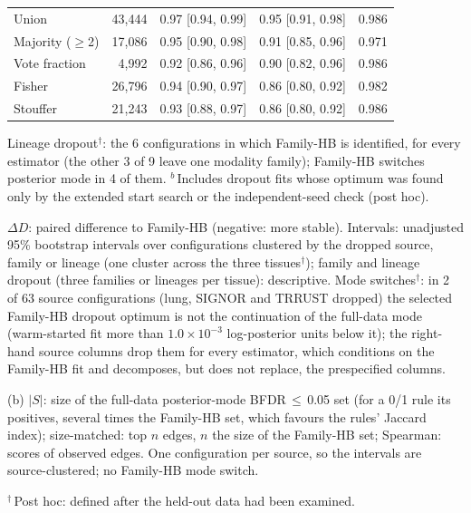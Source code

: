 \documentclass[11pt,a4paper]{article}
\begin{document}
\begin{table}[tbp]
{\begin{tabular}{@{}lrccc@{}}
Union & 43{,}444 & 0.97 [0.94, 0.99] & 0.95 [0.91, 0.98] & 0.986 \\
Majority ($\geq$2) & 17{,}086 & 0.95 [0.90, 0.98] & 0.91 [0.85, 0.96] & 0.971 \\
Vote fraction & 4{,}992 & 0.92 [0.86, 0.96] & 0.90 [0.82, 0.96] & 0.986 \\
Fisher & 26{,}796 & 0.94 [0.90, 0.97] & 0.86 [0.80, 0.92] & 0.982 \\
Stouffer & 21{,}243 & 0.93 [0.88, 0.97] & 0.86 [0.80, 0.92] & 0.986 \\
\bottomrule
\end{tabular}
}
\par\smallskip
\begin{minipage}{\linewidth}\footnotesize
Lineage dropout$^{\dagger}$: the 6 configurations in which Family-HB is identified, for every estimator (the other 3 of 9 leave one modality family); Family-HB switches posterior mode in 4 of them. $^{b}$\,Includes dropout fits whose optimum was found only by the extended start search or the independent-seed check (post hoc).

$\Delta D$: paired difference to Family-HB (negative: more stable). Intervals: unadjusted 95\% bootstrap intervals over configurations clustered by the dropped source, family or lineage (one cluster across the three tissues$^{\dagger}$); family and lineage dropout (three families or lineages per tissue): descriptive. Mode switches$^{\dagger}$: in 2 of 63 source configurations (lung, SIGNOR and TRRUST dropped) the selected Family-HB dropout optimum is not the continuation of the full-data mode (warm-started fit more than $1.0\times 10^{-3}$ log-posterior units below it); the right-hand source columns drop them for every estimator, which conditions on the Family-HB fit and decomposes, but does not replace, the prespecified columns.

(b) $|S|$: size of the full-data posterior-mode BFDR\,$\le$\,0.05 set (for a 0/1 rule its positives, several times the Family-HB set, which favours the rules' Jaccard index); size-matched: top $n$ edges, $n$ the size of the Family-HB set; Spearman: scores of observed edges. One configuration per source, so the intervals are source-clustered; no Family-HB mode switch.

$^{\dagger}$\,Post hoc: defined after the held-out data had been examined.
\end{minipage}
\end{table}
\end{document}

